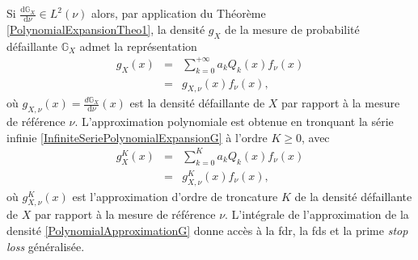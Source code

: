 Si $\frac{\text{d}\mathbb{G}_{X}}{\text{d}\nu}\in L^{2}(\nu)$ alors, par application du Théorème \ref{PolynomialExpansionTheo1}, la densité $g_{X}$ de la mesure de probabilité défaillante $\mathbb{G}_{X}$ admet la représentation 
\begin{eqnarray}\label{InfiniteSeriePolynomialExpansionG}
g_{X}(x)&=&\sum_{k=0}^{+\infty} a_{k}Q_{k}(x)f_{\nu}(x) \label{InfiniteSeriePolynomialExpansionG}\\
&=&g_{X,\nu}(x)f_{\nu}(x),\nonumber
\end{eqnarray}
où $g_{X,\nu}(x)=\frac{d\mathbb{G}_{X}}{\text{d}\nu}(x)$ est la densité défaillante de $X$ par rapport à la mesure de référence $\nu$. L'approximation polynomiale est obtenue en tronquant la série infinie \eqref{InfiniteSeriePolynomialExpansionG} à l\rq{}ordre $K\geq0$, avec
\begin{eqnarray}\label{PolynomialApproximationG}
g_{X}^{K}(x)&=&\sum_{k=0}^{K} a_{k}Q_{k}(x)f_{\nu}(x) \label{PolynomialApproximationG}\\
&=&g_{X,\nu}^{K}(x)f_{\nu}(x), \nonumber
\end{eqnarray}
où $g_{X,\nu}^{K}(x)$ est l\rq{}approximation d\rq{}ordre de troncature $K$ de la densité défaillante de $X$ par rapport à la mesure de référence $\nu$. L'intégrale de l'approximation de la densité \eqref{PolynomialApproximationG} donne accès à la \gls{fdr}, la \gls{fds} et la prime \textit{stop loss} généralisée.
